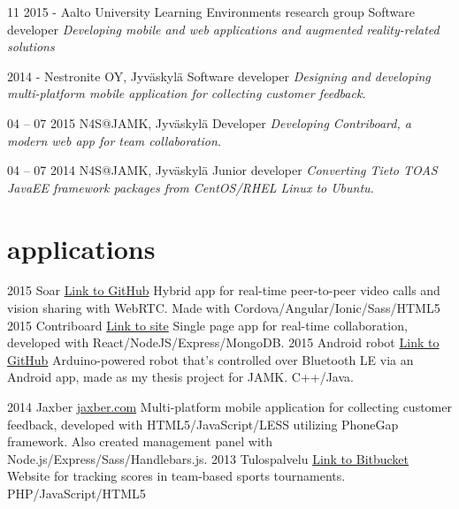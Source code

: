 \documentclass[]{friggeri-cv}
\begin{document}
\begin{entrylist}
  \entry
    {11 2015 - }
    {Aalto University Learning Environments research group}
    {Software developer}
    {\emph{Developing mobile and web applications and augmented reality-related solutions}}

  \entry
    {2014 - }
    {Nestronite OY, Jyväskylä}
    {Software developer}
    {\emph{Designing and developing multi-platform mobile application for collecting customer feedback.}}
    
    \entry
    {04 – 07 2015}
    {N4S@JAMK, Jyväskylä}
    {Developer}
    {\emph{Developing Contriboard, a modern web app for team collaboration.}}
  
  \entry
    {04 – 07 2014}
    {N4S@JAMK, Jyväskylä}
    {Junior developer}
    {\emph{Converting Tieto TOAS JavaEE framework packages from CentOS/RHEL Linux to Ubuntu.}}
    
\end{entrylist}

\section{applications}

\begin{entrylist}
  \entry
    {2015}
    {Soar}
    {\href{https://github.com/melonmanchan/sardroid}{Link to GitHub}}
    {Hybrid app for real-time peer-to-peer video calls and vision sharing with WebRTC. Made with Cordova/Angular/Ionic/Sass/HTML5}
  \entry
    {2015}
    {Contriboard}
    {\href{http://n4sjamk.github.io/contriboard/}{Link to site}}
    {Single page app for real-time collaboration, developed with React/NodeJS/Express/MongoDB.}
  \entry
    {2015}
    {Android robot}
    {\href{https://github.com/melonmanchan/Android-Robot-V2}{Link to GitHub}}
    {Arduino-powered robot that's controlled over Bluetooth LE via an Android app, made as my thesis project for JAMK. C++/Java.}

  \entry
    {2014}
    {Jaxber}
    {\href{http://jaxber.com}{jaxber.com}}
    {Multi-platform mobile application for collecting customer feedback, developed with HTML5/JavaScript/LESS utilizing PhoneGap framework. Also created management panel with Node.js/Express/Sass/Handlebars.js.}
  \entry
    {2013}
    {Tulospalvelu}
    {\href{https://bitbucket.org/teepalvelu/tulospalvelu}{Link to Bitbucket}}
    {Website for tracking scores in team-based sports tournaments. PHP/JavaScript/HTML5}
\end{entrylist}
\end{document}

